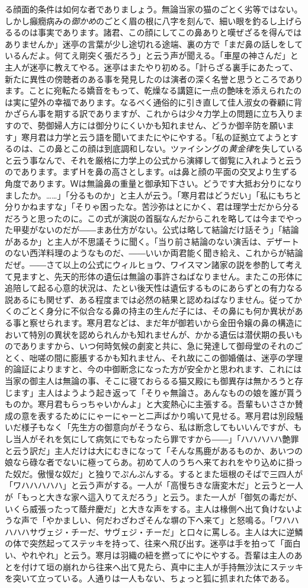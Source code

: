\documentclass[12pt, openright]{book}
\newcommand\blankpage{%
    \null
    \thispagestyle{empty}%
    \addtocounter{page}{-1}%
    \newpage}
\begin{document}
る顔面的条件は如何な者でありましょう。無論当家の猫のごとく劣等ではない。しかし癲癇病みの\emph{御かめ}のごとく眉の根に八字を刻んで、細い眼を釣るし上げらるるのは事実であります。諸君、この顔にしてこの鼻ありと嘆ぜざるを得んではありませんか」迷亭の言葉が少し途切れる途端、裏の方で「まだ鼻の話しをしているんだよ。何てえ剛突く張だろう」と云う声が聞える。「車屋の神さんだ」と主人が迷亭に教えてやる。迷亭はまたやり初める。「計らざる裏手にあたって、新たに異性の傍聴者のある事を発見したのは演者の深く名誉と思うところであります。ことに宛転たる嬌音をもって、乾燥なる講筵に一点の艶味を添えられたのは実に望外の幸福であります。なるべく通俗的に引き直して佳人淑女の眷顧に背かざらん事を期する訳でありますが、これからは少々力学上の問題に立ち入りますので、勢御婦人方には御分りにくいかも知れません、どうか御辛防を願います」寒月君は力学と云う語を聞いてまたにやにやする。「私の証拠立てようとするのは、この鼻とこの顔は到底調和しない。ツァイシングの\emph{黄金律}を失していると云う事なんで、それを厳格に力学上の公式から演繹して御覧に入れようと云うのであります。まずＨを鼻の高さとします。αは鼻と顔の平面の交叉より生ずる角度であります。Ｗは無論鼻の重量と御承知下さい。どうです大抵お分りになりましたか。\ldots{}\ldots{}」「分るものか」と主人が云う。「寒月君はどうだい」「私にもちと分りかねますな」「そりゃ困ったな。苦沙弥はとにかく、君は理学士だから分るだろうと思ったのに。この式が演説の首脳なんだからこれを略しては今までやった甲斐がないのだが――まあ仕方がない。公式は略して結論だけ話そう」「結論があるか」と主人が不思議そうに聞く。「当り前さ結論のない演舌は、デザートのない西洋料理のようなものだ、――いいか両君能く聞き給え、これからが結論だぜ。――さて以上の公式にウィルヒョウ、ワイスマン諸家の説を参酌して考えて見ますと、先天的形体の遺伝は無論の事許さねばなりません。またこの形体に追陪して起る心意的状況は、たとい後天性は遺伝するものにあらずとの有力なる説あるにも関せず、ある程度までは必然の結果と認めねばなりません。従ってかくのごとく身分に不似合なる鼻の持主の生んだ子には、その鼻にも何か異状がある事と察せられます。寒月君などは、まだ年が御若いから金田令嬢の鼻の構造において特別の異状を認められんかも知れませんが、かかる遺伝は潜伏期の長いものでありますから、いつ何時気候の劇変と共に、急に発達して御母堂のそれのごとく、咄嗟の間に膨脹するかも知れません、それ故にこの御婚儀は、迷亭の学理的論証によりますと、今の中御断念になった方が安全かと思われます、これには当家の御主人は無論の事、そこに寝ておらるる猫又殿にも御異存は無かろうと存じます」主人はようよう起き返って「そりゃ無論さ。あんなものの娘を誰が貰うものか。寒月君もらっちゃいかんよ」と大変熱心に主張する。吾輩もいささか賛成の意を表するためににゃーにゃーと二声ばかり鳴いて見せる。寒月君は別段騒いだ様子もなく「先生方の御意向がそうなら、私は断念してもいいんですが、もし当人がそれを気にして病気にでもなったら罪ですから――」「ハハハハハ艶罪と云う訳だ」主人だけは大にむきになって「そんな馬鹿があるものか、あいつの娘なら碌な者でないに極ってらあ。初めて人のうちへ来ておれをやり込めに掛った奴だ。傲慢な奴だ」と独りでぷんぷんする。するとまた垣根のそばで三四人が「ワハハハハハ」と云う声がする。一人が「高慢ちきな唐変木だ」と云うと一人が「もっと大きな家へ這入りてえだろう」と云う。また一人が「御気の毒だが、いくら威張ったって蔭弁慶だ」と大きな声をする。主人は椽側へ出て負けないような声で「やかましい、何だわざわざそんな塀の下へ来て」と怒鳴る。「ワハハハハハサヴェジ・チーだ、サヴェジ・チーだ」と口々に罵しる。主人は大に逆鱗の体で突然起ってステッキを持って、往来へ飛び出す。迷亭は手を拍って「面白い、やれやれ」と云う。寒月は羽織の紐を撚ってにやにやする。吾輩は主人のあとを付けて垣の崩れから往来へ出て見たら、真中に主人が手持無沙汰にステッキを突いて立っている。人通りは一人もない、ちょっと狐に抓まれた体である。
\afterpage{\blankpage}
\afterpage{\blankpage}
\afterpage{\blankpage}
\end{document}
